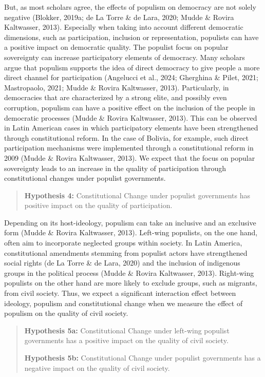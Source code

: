 \documentclass[
  abstract]{article}
\begin{document}
But, as most scholars agree, the effects of populism on democracy are
not solely negative (Blokker, 2019a; de La Torre \& de Lara, 2020; Mudde
\& Rovira Kaltwasser, 2013). Especially when taking into account
different democratic dimensions, such as participation, inclusion or
representation, populists can have a positive impact on democratic
quality. The populist focus on popular sovereignty can increase
participatory elements of democracy. Many scholars argue that populism
supports the idea of direct democracy to give people a more direct
channel for participation (Angelucci et al., 2024; Gherghina \& Pilet,
2021; Mastropaolo, 2021; Mudde \& Rovira Kaltwasser, 2013).
Particularly, in democracies that are characterized by a strong elite,
and possibly even corruption, populism can have a positive effect on the
inclusion of the people in democratic processes (Mudde \& Rovira
Kaltwasser, 2013). This can be observed in Latin American cases in which
participatory elements have been strengthened through constitutional
reform. In the case of Bolivia, for example, such direct participation
mechanisms were implemented through a constitutional reform in 2009
(Mudde \& Rovira Kaltwasser, 2013). We expect that the focus on popular
sovereignty leads to an increase in the quality of participation through
constitutional changes under populist governments.

\begin{quote}
\textbf{Hypothesis 4:} Constitutional Change under populist governments
has positive impact on the quality of participation.
\end{quote}

Depending on its host-ideology, populism can take an inclusive and an
exclusive form (Mudde \& Rovira Kaltwasser, 2013). Left-wing populists,
on the one hand, often aim to incorporate neglected groups within
society. In Latin America, constitutional amendments stemming from
populist actors have strengthened social rights (de La Torre \& de Lara,
2020) and the inclusion of indigenous groups in the political process
(Mudde \& Rovira Kaltwasser, 2013). Right-wing populists on the other
hand are more likely to exclude groups, such as migrants, from civil
society. Thus, we expect a significant interaction effect between
ideology, populism and constitutional change when we measure the effect
of populism on the quality of civil society.

\begin{quote}
\textbf{Hypothesis 5a:} Constitutional Change under left-wing populist
governments has a positive impact on the quality of civil society.

\textbf{Hypothesis 5b:} Constitutional Change under populist governments
has a negative impact on the quality of civil society.
\end{quote}
\end{document}
